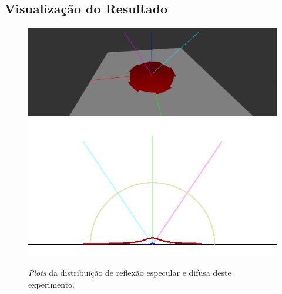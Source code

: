 \subsection{Visualização do Resultado}
\begin{figure}[H]
    \caption{\small{\textit{Plots} da distribuição de reflexão especular e difusa deste experimento.}}
    \label{fig-minnaert-plots}
    \vspace{42px}
  \includegraphics[width=\linewidth]{./Imagens/brdfs/minnaert-3D-plot}
\endminipage\hfill
{}
  \includegraphics[width=\linewidth]{./Imagens/brdfs/minnaert-polar-plot.png}
\endminipage\hfill
\end{figure}

